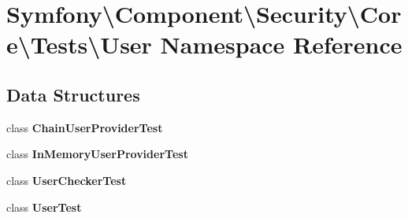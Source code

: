 \section{Symfony\textbackslash{}Component\textbackslash{}Security\textbackslash{}Core\textbackslash{}Tests\textbackslash{}User Namespace Reference}
\label{namespace_symfony_1_1_component_1_1_security_1_1_core_1_1_tests_1_1_user}
\subsection*{Data Structures}
\begin{DoxyCompactItemize}
\item 
class {\bf Chain\+User\+Provider\+Test}
\item 
class {\bf In\+Memory\+User\+Provider\+Test}
\item 
class {\bf User\+Checker\+Test}
\item 
class {\bf User\+Test}
\end{DoxyCompactItemize}

